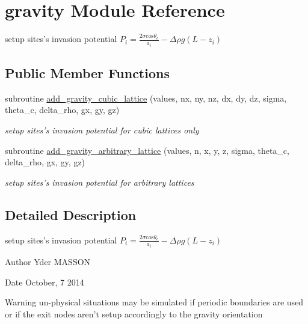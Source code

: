 \hypertarget{classgravity}{
\section{gravity \-Module \-Reference}
\label{classgravity}
}


setup sites's invasion potential $ P_i = \frac{2 \sigma \mbox{cos} \theta_c}{a_i}-\Delta \rho g (L-z_i)$  


\subsection*{\-Public \-Member \-Functions}
\begin{DoxyCompactItemize}
\item 
subroutine \hyperlink{classgravity_a0300a66abc16606a4c82d5a09fed8e16}{add\-\_\-gravity\-\_\-cubic\-\_\-lattice} (values, nx, ny, nz, dx, dy, dz, sigma, theta\-\_\-c, delta\-\_\-rho, gx, gy, gz)
\begin{DoxyCompactList}\small\item\em setup sites's invasion potential for cubic lattices only \end{DoxyCompactList}\item 
subroutine \hyperlink{classgravity_a3644291ef43e04cdcb02d57e0abafa8b}{add\-\_\-gravity\-\_\-arbitrary\-\_\-lattice} (values, n, x, y, z, sigma, theta\-\_\-c, delta\-\_\-rho, gx, gy, gz)
\begin{DoxyCompactList}\small\item\em setup sites's invasion potential for arbitrary lattices \end{DoxyCompactList}\end{DoxyCompactItemize}


\subsection{\-Detailed \-Description}
setup sites's invasion potential $ P_i = \frac{2 \sigma \mbox{cos} \theta_c}{a_i}-\Delta \rho g (L-z_i)$ 

\begin{DoxyAuthor}{\-Author}
\-Yder \-M\-A\-S\-S\-O\-N 
\end{DoxyAuthor}
\begin{DoxyDate}{\-Date}
\-October, 7 2014 
\end{DoxyDate}
\begin{DoxyWarning}{\-Warning}
un-\/physical situations may be simulated if periodic boundaries are used or if the exit nodes aren't setup accordingly to the gravity orientation 
\end{DoxyWarning}


